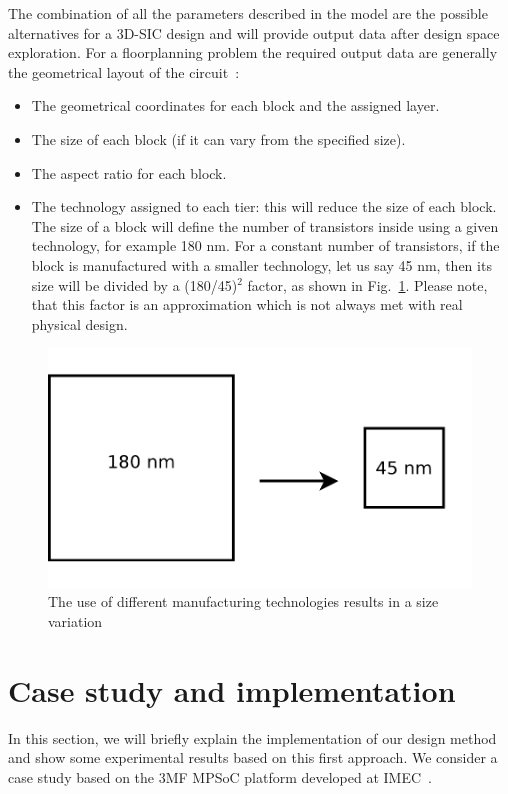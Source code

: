 The combination of all the parameters described in the model are the possible alternatives for a 3D-SIC design and will provide output data after design space exploration. For a floorplanning problem the required output data are generally the geometrical layout of the circuit~\cite{DBLP:conf/3dic/MilojevicCCRRSAPM09}:
\begin{itemize}
\item The geometrical coordinates for each block and the assigned layer.
\item The size of each block (if it can vary from the specified size).
\item The aspect ratio for each block.
\item The technology assigned to each tier: this will reduce the size of each block. The size of a block will define the number of transistors inside using a given technology, for example 180 nm. For a constant number of transistors, if the block is manufactured with a smaller technology, let us say 45 nm, then its size will be divided by a (180/45)$^2$ factor, as shown in Fig.~\ref{fig:tech_ex}. Please note, that this factor is an approximation which is not always met with real physical design.
\end{itemize}
\begin{figure}[h!]
\begin{center}
\includegraphics[width=0.9\linewidth]{tech_ex.pdf}
\end{center}
\vspace{-0.5cm}
\caption{The use of different manufacturing technologies results in a size variation}
\label{fig:tech_ex}
\end{figure}

\section{Case study and implementation}
In this section, we will briefly explain the implementation of our design method and show some experimental results based on this first approach. We consider a case study based on the 3MF MPSoC platform developed at IMEC~\cite{dmilojev08b}.

